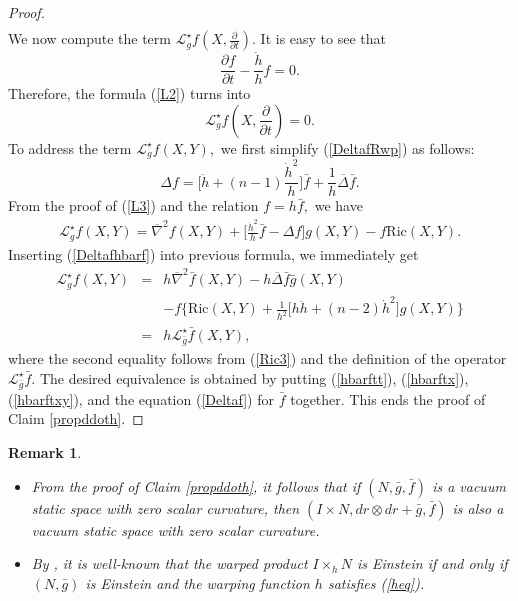 \documentclass[10pt,leqno,oneside]{amsart}
\newtheorem{Rmk}{Remark}
\begin{document}
{\begin{proof}
\begin{eqnarray}
         \end{eqnarray}
         We now compute the term $\mathcal{L}_g^{\star}f(X,\frac{\partial}{\partial t}).$ It is easy to see that
         $$\frac{\partial f}{\partial t}-\frac{\dot{h}}{h}f=0.$$
         Therefore, the formula (\ref{L2}) turns into
         \begin{equation}\label{hbarftx}
           \mathcal{L}_g^{\star}f(X,\frac{\partial}{\partial t})=0.
         \end{equation}
         To address the term $\mathcal{L}_g^{\star}f(X,Y),$ we first simplify (\ref{DeltafRwp}) as follows:
         \begin{equation}\label{Deltafhbarf}
           \Delta f=\big[\ddot{h}+(n-1)\frac{\dot{h}^2}{h}\big]\bar{f}+\frac{1}{h}\overline{\Delta}\bar{f}.
         \end{equation}
         From the proof of (\ref{L3}) and the relation $f=h\bar{f},$ we have
         \begin{eqnarray*}
         \mathcal{L}_g^{\star}f(X,Y)=\overline{\nabla}^2 f(X,Y)+\Big[\frac{\dot{h}^2}{h}\bar{f}-\Delta f\Big]g(X,Y)-f\text{Ric}(X,Y).
         \end{eqnarray*}
         Inserting (\ref{Deltafhbarf}) into previous formula, we immediately get
         \begin{eqnarray}\nonumber
         \mathcal{L}_g^{\star}f(X,Y)&=&h\overline{\nabla}^2 \bar{f}(X,Y)-h\overline{\Delta}\bar{f}\bar{g}(X,Y)\\\nonumber
         &&-f\Big\{\text{Ric}(X,Y)+\frac{1}{h^2}\big[h\ddot{h}+(n-2)\dot{h}^2\big]g(X,Y)\Big\}\\\label{hbarftxy}
         &=&h\mathcal{L}_{\bar{g}}^{\star}\bar{f}(X,Y),
         \end{eqnarray}
         where the second equality follows from (\ref{Ric3}) and the definition of the operator $\mathcal{L}_{\bar{g}}^{\star}\bar{f}.$ The desired equivalence is obtained by putting (\ref{hbarftt}), (\ref{hbarftx}), (\ref{hbarftxy}), and the equation (\ref{Deltaf}) for $\bar{f}$ together. This ends the proof of Claim \ref{propddoth}.
    \end{proof}
    \begin{Rmk}
       \begin{itemize}[leftmargin=0.3cm, itemindent=0.4cm]
        \item[{\rm 1.}] From the proof of Claim {\rm\ref{propddoth}}, it follows that if $(N, \bar{g},\bar{f})$ is a vacuum static space with zero scalar curvature, then $(I\times N, dr\otimes dr+\bar{g}, \bar{f})$ is also a vacuum static space with zero scalar curvature.
        \item[{\rm 2.}] By {\rm\cite{Bess1987}}, it is well-known that the warped product $I\times_hN$ is Einstein if and only if $(N, \bar{g})$ is Einstein and the warping function $h$ satisfies {\rm(\ref{heq})}.
        \end{itemize}
    \end{Rmk}


}
\end{document}
